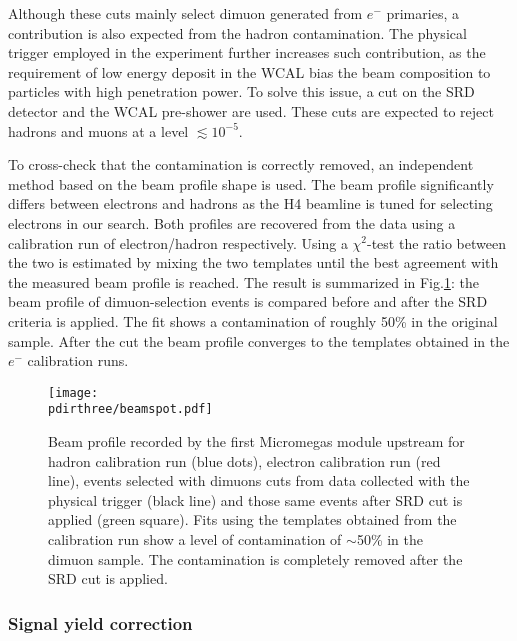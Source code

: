 Although these cuts mainly select dimuon generated from $e^-$ primaries, a contribution is also expected from the hadron contamination. The physical trigger employed in the experiment further increases such contribution, as the requirement of low energy deposit in the WCAL bias the beam composition to particles with high penetration power. To solve this issue, a cut on the SRD detector and the WCAL pre-shower are used. These cuts are expected to reject hadrons and muons at a level $\lesssim10^{-5}$.

To cross-check that the contamination is correctly removed, an independent method based on the beam profile shape is used. The beam profile significantly differs between electrons and hadrons as the H4 beamline is tuned for selecting electrons in our search. Both profiles are recovered from the data using a calibration run of electron/hadron respectively. Using a  $\chi^2$-test the ratio between the two is estimated by mixing the two templates until the best agreement with the measured beam profile is reached. The result is summarized in Fig.\ref{fig:dimuon:profile}: the beam profile of dimuon-selection events is compared before and after the SRD criteria is applied. The fit shows a contamination of roughly 50\% in the original sample. After the cut the beam profile converges to the templates obtained in the $e^-$ calibration runs.

\begin{figure}[tbh!]
  \centering
    \texttt{[image: \\pdirthree/beamspot.pdf]}
  \caption[Beam profile with different cuts]{Beam profile recorded by the first Micromegas module upstream for hadron calibration run (blue dots), electron calibration run (red line), events selected with dimuons cuts from data collected with the physical trigger (black line) and those same events after SRD cut is applied (green square). Fits using the templates obtained from the calibration run show a level of contamination of $\sim$50\% in the dimuon sample. The contamination is completely removed after the SRD cut is applied.}
  \label{fig:dimuon:profile}
\end{figure}


\subsubsection{Signal yield correction}
\label{ch3:sec:dimuons-sig-corr}

